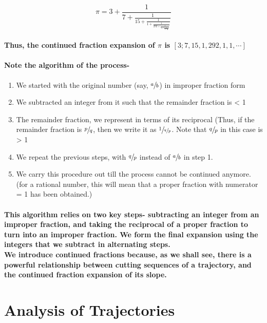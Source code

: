 \documentclass{report}
\begin{document}
\begin{displaymath}
{\pi = 3 + \frac{1}{7 + \frac{1}{15 + \frac{1}{1 + \frac{1}{292 + \frac{1}{1 + \frac{1}{1 + \frac{1}{\ddots}}}}}}}}
\end{displaymath}


\paragraph{Thus, the continued fraction expansion of $\pi$ is $[3; 7, 15, 1, 292, 1, 1,\cdots]$}

\paragraph{Note the algorithm of the process-}


\begin{enumerate}

\item  {We started with the original number (say, $\sfrac{a}{b}$) in improper fraction form}
\item  {We subtracted an integer from it such that the remainder fraction is < 1}
\item  {The remainder fraction, we represent in terms of its reciprocal (Thus, if the remainder fraction is $\sfrac{p}{q}$, then we write it as $\sfrac{1}{\sfrac{q}{p}}$. Note that $\sfrac{q}{p}$ in this case is > 1}
\item  {We repeat the previous steps, with $\sfrac{q}{p}$ instead of $\sfrac{a}{b}$ in step 1.}
\item  {We carry this procedure out till the process cannot be continued anymore. (for a rational number, this will mean that a proper fraction with numerator = 1 has been obtained.)}
\end{enumerate}

\paragraph{This algorithm relies on two key steps- subtracting an integer from an improper fraction, and taking the reciprocal of a proper fraction to turn into an improper fraction. We form the final expansion using the integers that we subtract in alternating steps.
\\
We introduce continued fractions because, as we shall see, there is a powerful relationship between cutting sequences of a trajectory, and the continued fraction expansion of its slope.}

\section{Analysis of Trajectories}
\end{document}
